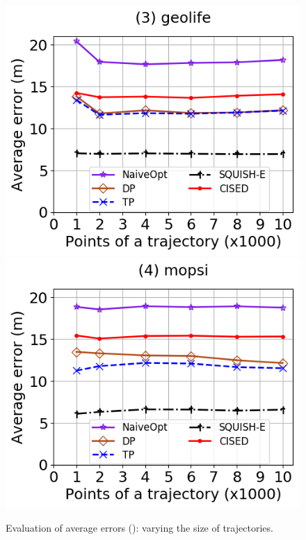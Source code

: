\begin{figure}[tb!]
	\includegraphics[scale=0.315]{Figures/Exp-SED-error-size-geolife.png}	\hspace{1ex}
	\includegraphics[scale=0.315]{Figures/Exp-SED-error-size-mopsi.png}		
	\vspace{-3ex}
	\caption{\small Evaluation of average errors (\sed): varying the size of
    trajectories.}
  \label{fig:ae-sed-size}
	\vspace{-2ex}
\end{figure}


